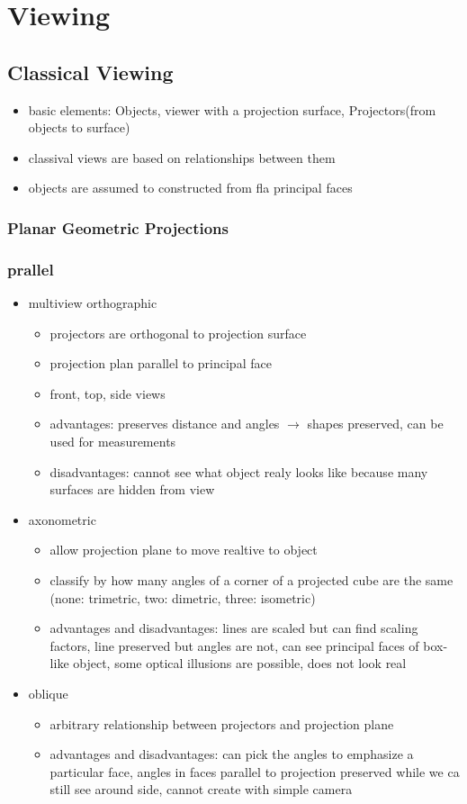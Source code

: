 \documentclass[11pt,a4paper]{article}
\begin{document}
\section{Viewing}
	 \subsection{Classical Viewing}
	\begin{itemize}
		\item basic elements: Objects, viewer with a projection surface, Projectors(from objects to surface)
		\item classival views are based on relationships between them
		\item objects are assumed to constructed from fla principal faces
	\end{itemize}
	\subsubsection{Planar Geometric Projections}
	\subsubsection{prallel}
	\begin{itemize}
		\item multiview orthographic
		\begin{itemize}
			\item projectors are orthogonal to projection surface
			\item projection plan parallel to principal face
			\item front, top, side views
			\item advantages: preserves distance and angles $\rightarrow$ shapes preserved, can be used for measurements
			\item disadvantages: cannot see what object realy looks like because many surfaces are hidden from view
		\end{itemize}
		\item axonometric
		\begin{itemize}
			\item allow projection plane to move realtive to object
			\item classify by how many angles of a corner of a projected cube are the same (none: trimetric, two: dimetric, three: isometric)
			\item advantages and disadvantages: lines are scaled but can find scaling factors, line preserved but angles are not, can see principal faces of box-like object, some optical 				illusions are possible, does not look real
		\end{itemize}
		\item oblique
		\begin{itemize}
			\item arbitrary relationship between projectors and projection plane
			\item advantages and disadvantages: can pick the angles to emphasize a particular face, angles in faces parallel to projection preserved while we ca still see around side, 
			cannot create with simple camera
		\end{itemize}
	\end{itemize}
\end{document}
